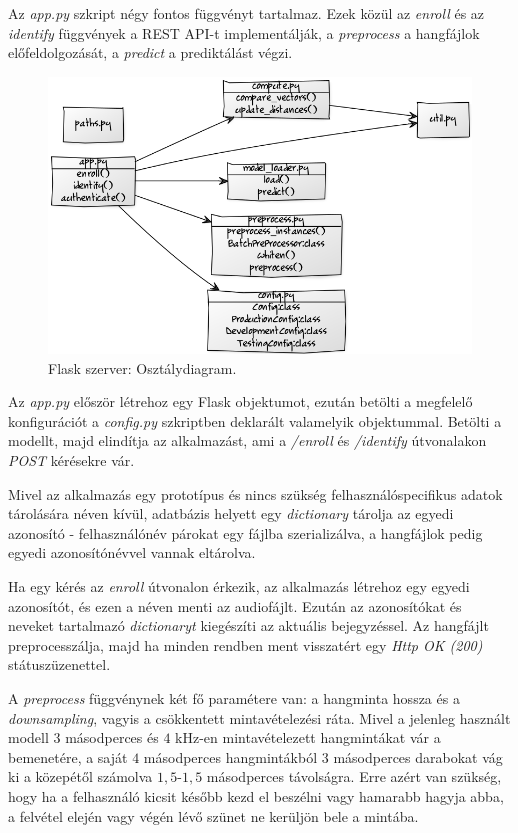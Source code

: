Az \emph{app.py} szkript négy fontos függvényt tartalmaz. Ezek közül az \emph{enroll} és az \emph{identify} függvények a REST API-t implementálják, a \emph{preprocess} a hangfájlok előfeldolgozását, a \emph{predict} a prediktálást végzi.

\begin{figure}[!ht]
	\centering
	\includegraphics[width=130mm, keepaspectratio]{figures/flask-class-diag.png}
	\caption{Flask szerver: Osztálydiagram.}
	\label{fig:flask-class-diag}
\end{figure}

Az \emph{app.py} először létrehoz egy Flask objektumot, ezután betölti a megfelelő konfigurációt a \emph{config.py} szkriptben deklarált valamelyik objektummal. Betölti a modellt, majd elindítja az alkalmazást, ami a \emph{/enroll} és \emph{/identify} útvonalakon \emph{POST} kérésekre vár.

Mivel az alkalmazás egy prototípus és nincs szükség felhasználóspecifikus adatok tárolására néven kívül, adatbázis helyett egy \emph{dictionary} tárolja az egyedi azonosító - felhasználónév párokat egy fájlba szerializálva, a hangfájlok pedig egyedi azonosítónévvel vannak eltárolva.

Ha egy kérés az \emph{enroll} útvonalon érkezik, az alkalmazás létrehoz egy egyedi azonosítót, és ezen a néven menti az audiofájlt. Ezután az azonosítókat és neveket tartalmazó \emph{dictionaryt} kiegészíti az aktuális bejegyzéssel. Az hangfájlt preprocesszálja, majd ha minden rendben ment visszatért egy \emph{Http OK (200)} státuszüzenettel.

A \emph{preprocess} függvénynek két fő paramétere van: a hangminta hossza és a \emph{downsampling}, vagyis a csökkentett mintavételezési ráta. Mivel a jelenleg használt modell $3$ másodperces és $4$ kHz-en mintavételezett hangmintákat vár a bemenetére, a saját $4$ másodperces hangmintákból $3$ másodperces darabokat vág ki a közepétől számolva $1,5$-$1,5$ másodperces távolságra. Erre azért van szükség, hogy ha a felhasználó kicsit később kezd el beszélni vagy hamarabb hagyja abba, a felvétel elején vagy végén lévő szünet ne kerüljön bele a mintába.
\newline

